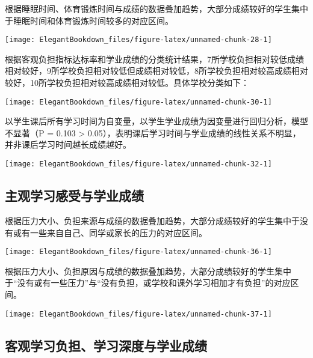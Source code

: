 \documentclass[cn, 11pt, fancy, hide]{elegantbook}
\begin{document}
根据睡眠时间、体育锻炼时间与成绩的数据叠加趋势，大部分成绩较好的学生集中于睡眠时间和体育锻炼时间较多的对应区间。

\begin{center}\texttt{[image: ElegantBookdown\_files/figure-latex/unnamed-chunk-28-1]} \end{center}

根据客观负担指标达标率和学业成绩的分类统计结果，7所学校负担相对较低成绩相对较好，9所学校负担相对较低但成绩相对较低，8所学校负担相对较高成绩相对较好，10所学校负担相对较高成绩相对较低。具体学校分类如下：

\begin{center}\texttt{[image: ElegantBookdown\_files/figure-latex/unnamed-chunk-30-1]} \end{center}

以学生课后所有学习时间为自变量，以学生学业成绩为因变量进行回归分析，模型不显著（P = 0.103 \textgreater{} 0.05），表明课后学习时间与学业成绩的线性关系不明显，并非课后学习时间越长成绩越好。

\begin{center}\texttt{[image: ElegantBookdown\_files/figure-latex/unnamed-chunk-32-1]} \end{center}

\hypertarget{section-11}{%
\subsection{主观学习感受与学业成绩}\label{section-11}}

根据压力大小、负担来源与成绩的数据叠加趋势，大部分成绩较好的学生集中于没有或有一些来自自己、同学或家长的压力的对应区间。

\begin{center}\texttt{[image: ElegantBookdown\_files/figure-latex/unnamed-chunk-36-1]} \end{center}

根据压力大小、负担原因与成绩的数据叠加趋势，大部分成绩较好的学生集中于``没有或有一些压力''与``没有负担，或学校和课外学习相加才有负担''的对应区间。

\begin{center}\texttt{[image: ElegantBookdown\_files/figure-latex/unnamed-chunk-37-1]} \end{center}

\hypertarget{section-12}{%
\subsection{客观学习负担、学习深度与学业成绩}\label{section-12}}
\end{document}
